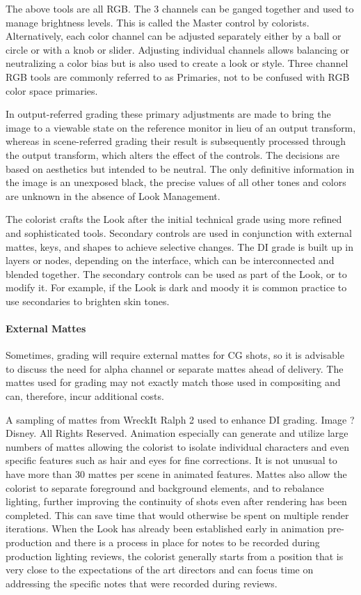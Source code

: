 The above tools are all RGB. The 3 channels can be ganged together and used to manage brightness levels. This is called the Master control by colorists. Alternatively, each color channel can be adjusted separately either by a ball or circle or with a knob or slider. Adjusting individual channels allows balancing or neutralizing a color bias but is also used to create a look or style. Three channel RGB tools are commonly referred to as Primaries, not to be confused with RGB color space primaries.

In output-referred grading these primary adjustments are made to bring the image to a viewable state on the reference monitor in lieu of an output transform, whereas in scene-referred grading their result is subsequently processed through the output transform, which alters the effect of the controls. The decisions are based on aesthetics but intended to be neutral. The only definitive information in the image is an unexposed black, the precise values of all other tones and colors are unknown in the absence of Look Management.

The colorist crafts the Look after the initial technical grade using more refined and sophisticated tools. Secondary controls are used in conjunction with external mattes, keys, and shapes to achieve selective changes. The DI grade is built up in layers or nodes, depending on the interface, which can be interconnected and blended together. The secondary controls can be used as part of the Look, or to modify it. For example, if the Look is dark and moody it is common practice to use secondaries to brighten skin tones.

\paragraph{External Mattes}%
\label{par:external-mattes}

Sometimes, grading will require external mattes for CG shots, so it is advisable to discuss the need for alpha channel or separate mattes ahead of delivery. The mattes used for grading may not exactly match those used in compositing and can, therefore, incur additional costs.



A sampling of mattes from WreckIt Ralph 2 used to enhance DI grading.
Image ?Disney. All Rights Reserved.
Animation especially can generate and utilize large numbers of mattes allowing the colorist to isolate individual characters and even specific features such as hair and eyes for fine corrections. It is not unusual to have more than 30 mattes per scene in animated features. Mattes also allow the colorist to separate foreground and background elements, and to rebalance lighting, further improving the continuity of shots even after rendering has been completed. This can save time that would otherwise be spent on multiple render iterations. When the Look has already been established early in animation pre-production and there is a process in place for notes to be recorded during production lighting reviews, the colorist generally starts from a position that is very close to the expectations of the art directors and can focus time on addressing the specific notes that were recorded during reviews.

